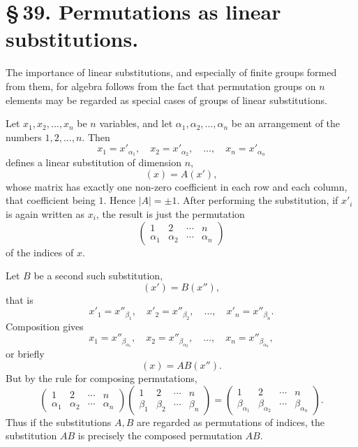 \documentclass[11pt]{article}
\begin{document}
\section*{\S\,39. Permutations as linear substitutions.}

The importance of linear substitutions, and especially of finite groups formed from them, for algebra follows from the fact that permutation groups on $n$ elements may be regarded as special cases of groups of linear substitutions.

Let $x_1,x_2,\ldots,x_n$ be $n$ variables, and let $\alpha_1,\alpha_2,\ldots,\alpha_n$ be an arrangement of the numbers $1,2,\ldots,n$. Then
\begin{equation}
x_1=x'_{\alpha_1},
\quad
x_2=x'_{\alpha_2},
\quad\ldots,\quad
x_n=x'_{\alpha_n}
\tag{1}
\end{equation}
defines a linear substitution of dimension $n$,
\begin{equation}
(x)=A(x'),
\tag{2}
\end{equation}
whose matrix has exactly one non-zero coefficient in each row and each column, that coefficient being $1$. Hence $|A|=\pm1$. After performing the substitution, if $x'_i$ is again written as $x_i$, the result is just the permutation
\[
\begin{pmatrix}1&2&\cdots&n\\\alpha_1&\alpha_2&\cdots&\alpha_n\end{pmatrix}
\]
of the indices of $x$.

Let $B$ be a second such substitution,
\begin{equation}
(x')=B(x''),
\tag{3}
\end{equation}
that is
\begin{equation}
x'_1=x''_{\beta_1},
\quad x'_2=x''_{\beta_2},
\quad\ldots,
\quad x'_n=x''_{\beta_n}.
\tag{4}
\end{equation}
Composition gives
\begin{equation}
x_1=x''_{\beta_{\alpha_1}},
\quad x_2=x''_{\beta_{\alpha_2}},
\quad\ldots,
\quad x_n=x''_{\beta_{\alpha_n}},
\tag{5}
\end{equation}
or briefly
\begin{equation}
(x)=AB(x'').
\tag{6}
\end{equation}
But by the rule for composing permutations,
\begin{equation}
\begin{pmatrix}1&2&\cdots&n\\\alpha_1&\alpha_2&\cdots&\alpha_n\end{pmatrix}
\begin{pmatrix}1&2&\cdots&n\\\beta_1&\beta_2&\cdots&\beta_n\end{pmatrix}
=
\begin{pmatrix}1&2&\cdots&n\\\beta_{\alpha_1}&\beta_{\alpha_2}&\cdots&\beta_{\alpha_n}\end{pmatrix}.
\tag{7}
\end{equation}
Thus if the substitutions $A,B$ are regarded as permutations of indices, the substitution $AB$ is precisely the composed permutation $AB$.
\end{document}
